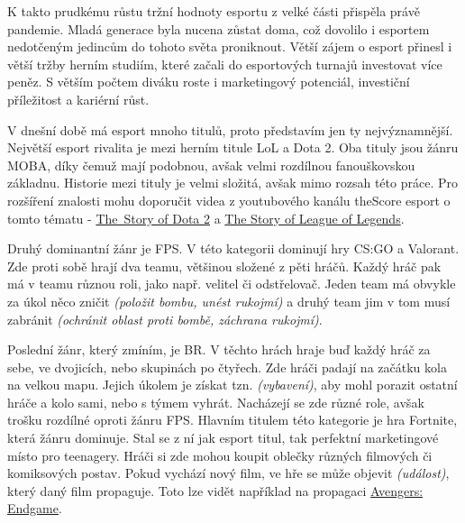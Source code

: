 K takto prudkému růstu tržní hodnoty esportu z velké části přispěla právě pandemie. Mladá generace byla nucena zůstat doma, což dovolilo i esportem nedotčeným jedincům do
tohoto světa proniknout. Větší zájem o esport přinesl i větší tržby herním studiím, které začali do esportových turnajů investovat více peněz\cite{Professeur2021}\cite{liquipedia2021}.
S větším počtem diváku roste i marketingový potenciál, investiční příležitost a kariérní růst.

V dnešní době má esport mnoho titulů, proto představím jen ty nejvýznamnější. Největší esport rivalita je mezi herním titule \ac{LoL} a Dota 2. Oba tituly jsou žánru \ac{MOBA}, díky 
čemuž mají podobnou, avšak velmi rozdílnou fanouškovskou základnu. Historie mezi tituly je velmi složitá, avšak mimo rozsah této práce. Pro rozšíření znalosti mohu doporučit videa 
z youtubového kanálu theScore esport o tomto tématu - \href{https://www.youtube.com/watch?v=h9Zv_TiVzmg}{The~Story of Dota 2} a \href{https://www.youtube.com/watch?v=tHtfD-MnQK8}{The Story of League of Legends}.

Druhý dominantní žánr je \ac{FPS}. V této kategorii dominují hry \ac{CS:GO} a Valorant. Zde proti sobě hrají dva teamu, většinou složené z pěti hráčů. Každý hráč pak má v teamu různou roli, jako např. velitel
či odstřelovač. Jeden team má obvykle za úkol něco zničit \textit{(položit bombu, unést rukojmí)} a druhý team jim v tom musí zabránit \textit{(ochránit oblast proti bombě, záchrana rukojmí)}.

Poslední žánr, který zmíním, je \ac{BR}. V těchto hrách hraje buď každý hráč za sebe, ve dvojicích, nebo skupinách po čtyřech. Zde hráči padají na začátku kola na velkou mapu. Jejich úkolem je
získat tzn.  \textit{(vybavení)}, aby mohl porazit ostatní hráče a kolo sami, nebo s týmem vyhrát. Nacházejí se zde různé role, avšak trošku rozdílné oproti žánru \ac{FPS}. Hlavním titulem
této kategorie je hra Fortnite, která žánru dominuje. Stal se z ní jak esport titul, tak perfektní marketingové místo pro teenagery. Hráči si zde mohou koupit oblečky různých filmových či komiksových postav.
Pokud vychází nový film, ve hře se může objevit  \textit{(událost)}, který daný film propaguje. Toto lze vidět například na propagaci \href{https://www.youtube.com/watch?v=TanGK9o_d24}{Avengers: Endgame}.

